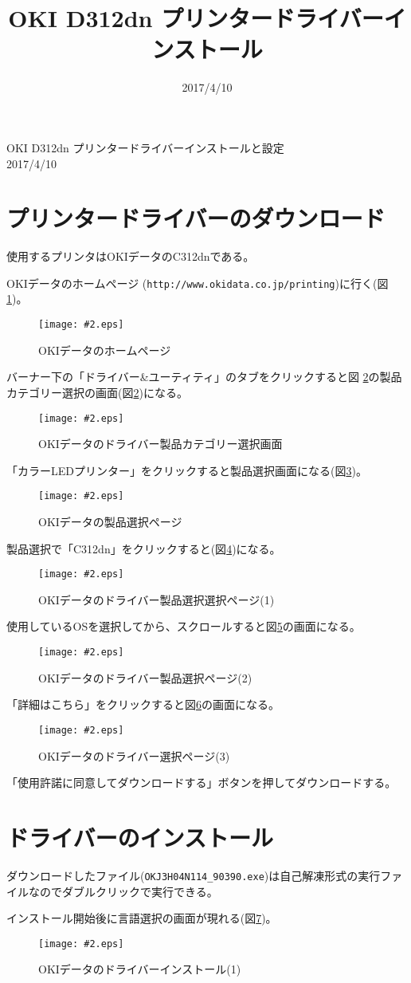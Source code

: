 \documentclass[a4j]{jarticle}
\title{OKI D312dn プリンタードライバーインストール}
\date{2017/4/10}
\newcommand{\Fig}[4]{%
\begin{figure}[h]
\centering  \texttt{[image: \#2.eps]}
 \caption{#3}\label{#4}
\end{figure}}
\newcommand{\FigL}[3]{\Fig{0.7}{#1}{#2}{#3}}
\newcommand{\FigS}[3]{\Fig{0.4}{#1}{#2}{#3}}
\begin{document}
\begin{center}
 {\Large OKI D312dn プリンタードライバーインストールと設定}\\
 \hspace*{\fill}2017/4/10
\end{center}
\section{プリンタードライバーのダウンロード}
使用するプリンタはOKIデータのC312dnである。

OKIデータのホームページ
(\texttt{http://www.okidata.co.jp/printing})に行く(図\ref{OkiData})。
\FigL{OKI1}{OKIデータのホームページ}{OkiData}

バーナー下の「ドライバー\&ユーティティ」のタブをクリックすると図
\ref{Driver}の製品カテゴリー選択の画面(図\ref{Driver})になる。

\FigL{OKI2}{OKIデータのドライバー製品カテゴリー選択画面}{Driver}
\newpage

「カラーLEDプリンター」をクリックすると製品選択画面になる(図\ref{Driver1})。
\FigL{OKI3}{OKIデータの製品選択ページ}{Driver1}

製品選択で「C312dn」をクリックすると(図\ref{Driver2})になる。

\FigL{OKI4}{OKIデータのドライバー製品選択選択ページ(1)}{Driver2}
\newpage
使用しているOSを選択してから、スクロールすると図\ref{Driver3}の画面になる。
\FigL{OKI5}{OKIデータのドライバー製品選択ページ(2)}{Driver3}

「詳細はこちら」をクリックすると図\ref{Driver4}の画面になる。
\FigL{OKI6}{OKIデータのドライバー選択ページ(3)}{Driver4}

「使用許諾に同意してダウンロードする」ボタンを押してダウンロードする。
\renewcommand{\FigL}[3]{\Fig{0.4}{#1}{#2}{#3}}

\section{ドライバーのインストール}
ダウンロードしたファイル(\texttt{OKJ3H04N114\_90390.exe})は自己解凍形式の実行ファ
イルなのでダブルクリックで実行できる。
\newpage

インストール開始後に言語選択の画面が現れる(図\ref{Install01})。
\FigS{Install01}{OKIデータのドライバーインストール(1)}{Install01}
\end{document}
